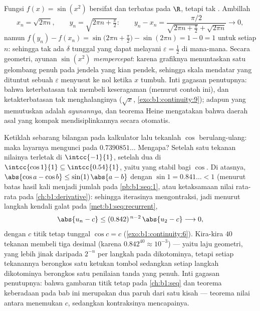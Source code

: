 \begin{example}\label{ex:b1:continuity:sinx2}
Fungsi $f(x) = \sin(x^2)$ bersifat  dan terbatas pada
$\R$, tetapi tak . Ambillah
\[
x_n = \sqrt{2\pi n}, \qquad y_n = \sqrt{2\pi n + \tfrac\pi2}:
\qquad
y_n - x_n = \frac{\pi/2}{\sqrt{2\pi n + \frac\pi2} +
\sqrt{2\pi n}} \longrightarrow 0 ,
\]
namun $f(y_n) - f(x_n) = \sin\bigl(2\pi n + \frac\pi2\bigr) -
\sin(2\pi n) = 1 - 0 = 1$ untuk setiap $n$: sehingga tak ada $\delta$ tunggal yang dapat
melayani $\varepsilon = \frac12$ di mana-mana. Secara geometri,
ayunan $\sin(x^2)$ \emph{mempercepat}: karena grafiknya
menuntaskan satu gelombang penuh pada jendela yang kian pendek, sehingga
skala mendatar yang dituntut sebuah $\varepsilon$ menyusut ke nol
ketika $x$ tumbuh. Inti gagasan penutupnya: bahwa keterbatasan tak membeli
keseragaman (menurut contoh ini), dan ketakterbatasan tak menghalanginya
($\sqrt x$, \cref{exo:b1:continuity:9}); adapun yang memutuskan adalah
\emph{ ayunannya}, dan teorema Heine mengatakan bahwa daerah asal yang
kompak mendisiplinkannya secara otomatis.
\end{example}

\begin{example}\label{ex:b1:continuity:cositeration}
Ketiklah sebarang bilangan pada kalkulator lalu tekanlah $\cos$ berulang-ulang:
maka layarnya mengunci pada $0.7390851\dots$ Mengapa? Setelah satu tekanan
nilainya terletak di $\intcc{-1}{1}$, setelah dua di $\intcc{\cos 1}{1}
\subseteq \intcc{0.54}{1}$, yaitu  yang stabil bagi $\cos$. Di atasnya,
$\abs{\cos a - \cos b} \leq \sin(1)\,\abs{a - b}$ dengan $\sin 1 =
0.841\dots < 1$ (menurut batas hasil kali menjadi jumlah pada
\cref{pb:b1:seq:1}, atau ketaksamaan nilai rata-rata pada
\cref{ch:b1:derivative}): sehingga iterasinya mengontraksi, jadi menurut
langkah kendali galat pada \cref{met:b1:seq:recurrent},
\[
\abs{u_n - c} \leq (0.842)^{\,n-2}\,\abs{u_2 - c}
\longrightarrow 0 ,
\]
dengan $c$ titik tetap tunggal $\cos c = c$
(\cref{exo:b1:continuity:6}). Kira-kira $40$ tekanan membeli tiga
desimal (karena $0.842^{40} \approx 10^{-3}$) --- yaitu laju geometri,
yang lebih jinak daripada $2^{-n}$ per langkah pada dikotominya, tetapi setiap tekanannya berongkos
satu ketukan tombol sedangkan setiap langkah dikotominya berongkos satu
penilaian tanda yang penuh. Inti gagasan penutupnya: bahwa gambaran titik tetap pada
\cref{ch:b1:seq} dan teorema keberadaan pada bab ini merupakan
dua paruh dari satu kisah --- teorema nilai antara menemukan $c$, sedangkan kontraksinya mencapainya.
\end{example}

